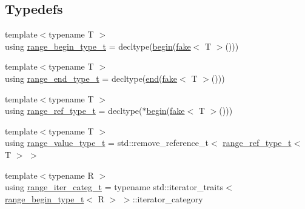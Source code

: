 \subsection*{Typedefs}
\begin{DoxyCompactItemize}
\item 
{\footnotesize template$<$typename T $>$ }\\using \mbox{\hyperlink{namespacerah_a28aff4eeddcece6be65ff0b956d32d4a}{range\+\_\+begin\+\_\+type\+\_\+t}} = decltype(\mbox{\hyperlink{namespacerah_a2c4a19e57cc4e0753e93830f247def6d}{begin}}(\mbox{\hyperlink{namespacerah_aa659f5ae02cb923cd8813f96cfd86a25}{fake}}$<$ T $>$()))
\item 
{\footnotesize template$<$typename T $>$ }\\using \mbox{\hyperlink{namespacerah_a9657e24ae477f4482225b133fe286b65}{range\+\_\+end\+\_\+type\+\_\+t}} = decltype(\mbox{\hyperlink{namespacerah_aaddd1442cd76b96876e692cdefe7261d}{end}}(\mbox{\hyperlink{namespacerah_aa659f5ae02cb923cd8813f96cfd86a25}{fake}}$<$ T $>$()))
\item 
{\footnotesize template$<$typename T $>$ }\\using \mbox{\hyperlink{namespacerah_a6622426bea22e9509614fe4c574ebeca}{range\+\_\+ref\+\_\+type\+\_\+t}} = decltype($\ast$\mbox{\hyperlink{namespacerah_a2c4a19e57cc4e0753e93830f247def6d}{begin}}(\mbox{\hyperlink{namespacerah_aa659f5ae02cb923cd8813f96cfd86a25}{fake}}$<$ T $>$()))
\item 
{\footnotesize template$<$typename T $>$ }\\using \mbox{\hyperlink{namespacerah_a4b32e39fb106af7036b20a39c4f024c1}{range\+\_\+value\+\_\+type\+\_\+t}} = std\+::remove\+\_\+reference\+\_\+t$<$ \mbox{\hyperlink{namespacerah_a6622426bea22e9509614fe4c574ebeca}{range\+\_\+ref\+\_\+type\+\_\+t}}$<$ T $>$ $>$
\item 
{\footnotesize template$<$typename R $>$ }\\using \mbox{\hyperlink{namespacerah_aff9b9a5748e293f6a1726308c1ac1a01}{range\+\_\+iter\+\_\+categ\+\_\+t}} = typename std\+::iterator\+\_\+traits$<$ \mbox{\hyperlink{namespacerah_a28aff4eeddcece6be65ff0b956d32d4a}{range\+\_\+begin\+\_\+type\+\_\+t}}$<$ R $>$ $>$\+::iterator\+\_\+category
\end{DoxyCompactItemize}
